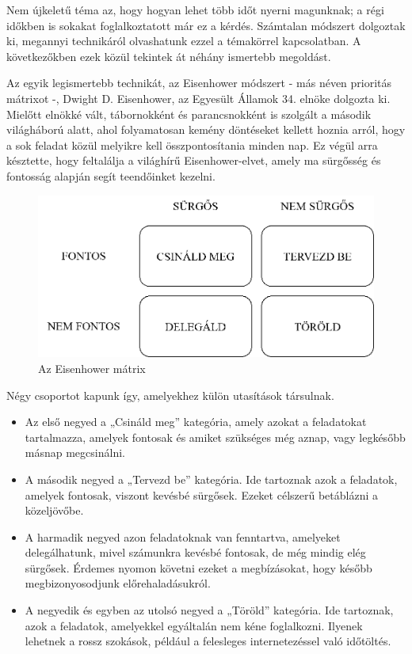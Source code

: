 
Nem újkeletű téma az, hogy hogyan lehet több időt nyerni magunknak; a régi időkben is sokakat foglalkoztatott már ez a kérdés. Számtalan módszert dolgoztak ki, megannyi technikáról olvashatunk ezzel a témakörrel kapcsolatban. A következőkben ezek közül tekintek át néhány ismertebb megoldást.


Az egyik legismertebb technikát, az Eisenhower módszert - más néven prioritás mátrixot -, Dwight D. Eisenhower, az Egyesült Államok 34. elnöke dolgozta ki. Mielőtt elnökké vált, tábornokként és parancsnokként is szolgált a második világháború alatt, ahol folyamatosan kemény döntéseket kellett hoznia arról, hogy a sok feladat közül melyikre kell összpontosítania minden nap. Ez végül arra késztette, hogy feltalálja a világhírű Eisenhower-elvet, amely ma sürgősség és fontosság alapján segít teendőinket kezelni.

\begin{figure}[h]
	\centering
	\includegraphics[scale=0.7]{images/eisenhower.png}
	\caption{Az Eisenhower mátrix}
\end{figure}

Négy csoportot kapunk így, amelyekhez külön utasítások társulnak.

\begin{itemize}
\item Az első negyed a „Csináld meg” kategória, amely azokat a feladatokat tartalmazza, amelyek fontosak és amiket szükséges még aznap, vagy legkésőbb másnap megcsinálni.
\item A második negyed a „Tervezd be” kategória. Ide tartoznak azok a feladatok, amelyek fontosak, viszont kevésbé sürgősek. Ezeket célszerű betáblázni a közeljövőbe.
\item A harmadik negyed azon feladatoknak van fenntartva, amelyeket delegálhatunk, mivel számunkra kevésbé fontosak, de még mindig elég sürgősek. Érdemes nyomon követni ezeket a megbízásokat, hogy később megbizonyosodjunk előrehaladásukról.
\item A negyedik és egyben az utolsó negyed a „Töröld” kategória. Ide tartoznak, azok a feladatok, amelyekkel egyáltalán nem kéne foglalkozni. Ilyenek lehetnek a rossz szokások, például a felesleges internetezéssel való időtöltés.\cite{matrix}
\end{itemize}

